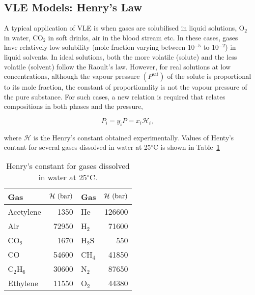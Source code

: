 \subsection{VLE Models: Henry's Law}\label{Chapter:VLE:Section:HenryLaw}
A typical application of VLE is when gases are solubilised in liquid solutions, \eg O$_{2}$ in water, CO$_{2}$ in soft drinks, air in the blood stream etc. In these cases, gases have relatively low solubility (mole fraction varying between 10$^{-5}$ to 10$^{-2}$) in liquid solvents. In ideal solutions, both the more volatile (\ie solute) and the less volatile (\ie solvent) follow the Raoult’s law. However, for real solutions at low concentrations, although the vapour pressure $\left(P^{\text{sat}}\right)$ of the solute is proportional to its mole fraction, the constant of proportionality is not the vapour pressure of the pure substance. For such cases, a new relation is required that relates compositions in both phases and the pressure,
\begin{shaded}
  \begin{equation}
      P_{i} = y_{i}P = x_{i}\mathcal{H}_{i},\label{Chapter:VLE:Eqn:HenryLaw} 
  \end{equation}
\end{shaded}
\noindent where $\mathcal{H}$ is the Henry's constant obtained experimentally. Values of Henty's contant for several gases dissolved in water at 25$^{\circ}$C is shown in Table~\ref{Chapter:VLE:Table:HenryLawTable}
 \begin{table}
  \begin{center}
    \begin{tabular}{l r || l r }
      \hline
       {\bf Gas}    &  ${\bf \mathcal{H}\text{ (bar)}}$ & {\bf Gas}    &  ${\bf \mathcal{H}\text{ (bar)}}$ \\
      \hline
         Acetylene  &   1350                            & He           &  126600 \\
         Air        &   72950                           & H$_{2}$      &  71600  \\
         CO$_{2}$    & 1670                              & H$_{2}$S     & 550 \\
         CO         &  54600                            &  CH$_{4}$    &  41850 \\
         C$_{2}$H$_{6}$ & 30600                          &  N$_{2}$     & 87650  \\
         Ethylene  & 11550                              & O$_{2}$      & 44380 \\
      \hline
    \end{tabular}
    \caption{Henry's constant for gases dissolved in water at 25$^{\circ}$C.}\label{Chapter:VLE:Table:HenryLawTable}
  \end{center}
\end{table}

